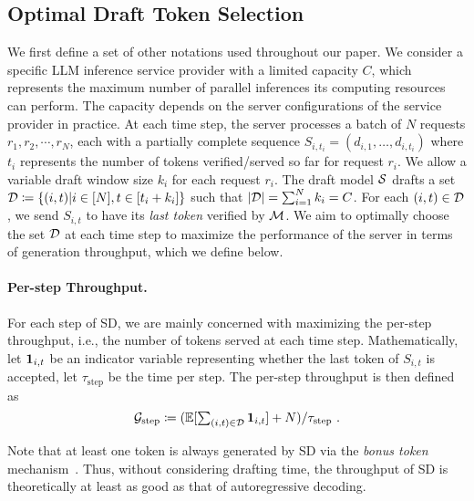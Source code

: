 \subsection{Optimal Draft Token Selection}
\label{sec:optimal_draft_selection}

We first define a set of other notations used throughout our paper.
We consider a specific LLM inference service provider with a limited capacity $C$, which represents the maximum number of parallel inferences its computing resources can perform. 
The capacity depends on the server configurations of the service provider in practice.
At each time step, the server processes a batch of $N$ requests $r_1, r_2, \cdots, r_N$, each with a partially complete sequence $S_{i,t_i} = (d_{i,1}, \ldots, d_{i, t_i})$ where $t_i$ represents the number of tokens verified/served so far for request $r_i$. 
We allow a variable draft window size $k_i$ for each request $r_i$. 
The draft model ${\mathcal{S}}$ drafts a set ${\mathcal{D}} \coloneqq \{(i, t) | i \in [N], t \in [t_i+k_i]\}$ such that $|{\mathcal{D}}| = \sum_{i=1}^{N} k_i = C$.
For each $(i,t) \in {\mathcal{D}}$, we send $S_{i,t}$ to have its \textit{last token} verified by ${\mathcal{M}}$. 
We aim to optimally choose the set ${\mathcal{D}}$ at each time step to maximize the performance of the server in terms of generation throughput, which we define below.

\paragraph{Per-step Throughput.} 
For each step of SD, we are mainly concerned with maximizing the per-step throughput, i.e., the number of tokens served at each time step. 
Mathematically, let ${\bm{1}}_{i,t}$ be an indicator variable representing whether the last token of $S_{i,t}$ is accepted, let $\tau_{\text{step}}$ be the time per step. The per-step throughput is then defined as
\begin{equation*}
   \textstyle {\mathcal{G}}_{\text{step}} \coloneqq (\mathbb{E}[\sum_{(i,t) \in {\mathcal{D}}}{\bm{1}}_{i,t}] + N ) / \tau_{\text{step}} \ .
\end{equation*}

Note that at least one token is always generated by SD via the \textit{bonus token} mechanism~\citep{leviathan2023}. Thus, without considering drafting time, the throughput of SD is theoretically at least as good as that of autoregressive decoding. 


